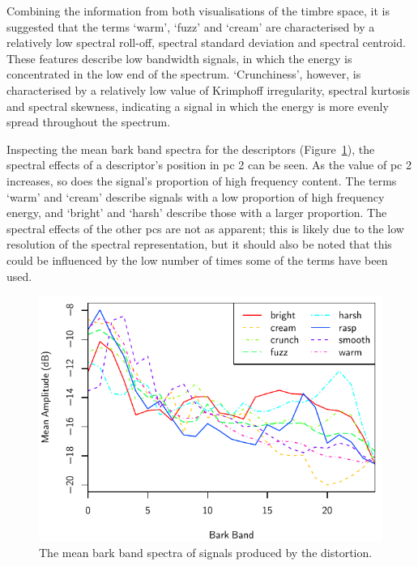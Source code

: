 			Combining the information from both visualisations of the timbre space, it is suggested that the
			terms `warm', `fuzz' and `cream' are characterised by a relatively low spectral roll-off, spectral
			standard deviation and spectral centroid. These features describe low bandwidth signals, in which
			the energy is concentrated in the low end of the spectrum. `Crunchiness', however, is characterised
			by a relatively low value of Krimphoff irregularity, spectral kurtosis and spectral skewness,
			indicating a signal in which the energy is more evenly spread throughout the spectrum.

			Inspecting the mean bark band spectra for the descriptors
			(Figure~\ref{fig:DistortionProcessedSpectra}), the spectral effects of a descriptor's position in
			\acrshort{pc} 2 can be seen. As the value of \acrshort{pc} 2 increases, so does the signal's
			proportion of high frequency content. The terms `warm' and `cream' describe signals with a low
			proportion of high frequency energy, and `bright' and `harsh' describe those with a larger
			proportion. The spectral effects of the other \acrshort{pc}s are not as apparent; this is likely
			due to the low resolution of the spectral representation, but it should also be noted that this
			could be influenced by the low number of times some of the terms have been used.

			\begin{figure}[h!]
				\centering
				\includegraphics{chapter4/Images/DistortionProcessedSpectra.pdf}
				\caption{The mean bark band spectra of signals produced by the distortion.}
				\label{fig:DistortionProcessedSpectra}
			\end{figure}

